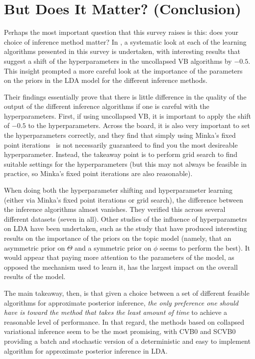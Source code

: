 \documentclass[11pt]{article}
\begin{document}
\section{But Does It Matter? (Conclusion)}

Perhaps the most important question that this survey raises is this:
does your choice of inference method matter? In
\citet{Asuncion:2009:onsmoothing}, a systematic look at each of the
learning algorithms presented in this survey is undertaken, with
interesting results that suggest a shift of the hyperparameters in the
uncollapsed VB algorithms by $-0.5$. This insight prompted a more careful
look at the importance of the parameters on the priors in the LDA model for
the different inference methods.

Their findings essentially prove that there is little difference in the
quality of the output of the different inference algorithms if one is
careful with the hyperparameters. First, if using uncollapsed VB, it is
important to apply the shift of $-0.5$ to the hyperparameters. Across the
board, it is also very important to set the hyperparameters correctly, and
they find that simply using Minka's fixed point
iterations~\cite{Minka:2000:fpiter} is not necessarily guaranteed to find you
the most desireable hyperparameter.  Instead, the takeaway point is to perform
grid search to find suitable settings for the hyperparameters (but this may not
always be feasible in practice, so Minka's fixed point iterations are also
reasonable).

When doing both the hyperparameter shifting and hyperparameter learning
(either via Minka's fixed point iterations or grid search), the difference
between the inference algorithms almost vanishes. They verified this across
several different datasets (seven in all). Other studies of the influence
of hyperparametrs on LDA have been undertaken, such as the
\citet*{Wallach:2009:NIPS} study that have produced interesting results on
the importance of the priors on the topic model (namely, that an asymmetric
prior on $\Theta$ and a symmetric prior on $\phi$ seems to perform the
best). It would appear that paying more attention to the parameters of the
model, as opposed the mechanism used to learn it, has the largest impact on
the overall results of the model.

The main takeaway, then, is that given a choice between a set of different
feasible algorithms for approximate posterior inference, \emph{the only
preference one should have is toward the method that takes the least amount
of time} to achieve a reasonable level of performance. In that regard, the
methods based on collapsed variational inference seem to be the most
promising, with CVB0 and SCVB0 providing a batch and stochastic version of
a deterministic and easy to implement algorithm for approximate posterior
inference in LDA.

\small


\end{document}

